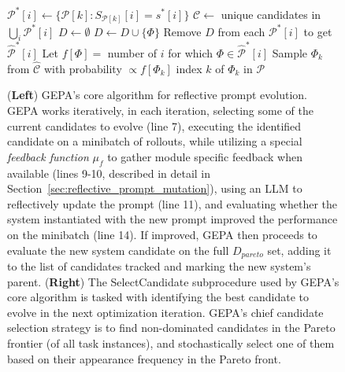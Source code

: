 \begin{figure}[t]
\begin{minipage}[t]{0.44\textwidth}
\begin{algorithm}[H]
\begin{algorithmic}[1]
            \State $\mathcal{P}^*[i] \gets \{\mathcal{P}[k] : S_{\mathcal{P}[k]}[i] = s^*[i]\}$
        \EndFor
        \State $\mathcal{C} \gets$ unique candidates in $\bigcup_i \mathcal{P}^*[i]$
        \State $D \gets \emptyset$
            \State $D \gets D \cup \{\Phi\}$
        \EndWhile
        \State Remove $D$ from each $\mathcal{P}^*[i]$ to get $\hat{\mathcal{P}}^*[i]$
        \State Let $f[\Phi]=$ number of $i$ for which $\Phi \in \hat{\mathcal{P}}^*[i]$
        \State Sample $\Phi_k$ from $\hat{\mathcal{C}}$ with probability $\propto f[\Phi_k]$
        \State \Return index $k$ of $\Phi_k$ in $\mathcal{P}$
    \EndFunction
    \end{algorithmic}\label{alg:pareto_selection}
    \end{algorithm}
\end{minipage}
\caption{(\textbf{Left}) GEPA's core algorithm for reflective prompt evolution. GEPA works iteratively, in each iteration, selecting some of the current candidates to evolve (line 7), executing the identified candidate on a minibatch of rollouts, while utilizing a special \textit{feedback function} $\mu_f$ to gather module specific feedback when available (lines 9-10, described in detail in Section~\ref{sec:reflective_prompt_mutation}), using an LLM to reflectively update the prompt (line 11), and evaluating whether the system instantiated with the new prompt improved the performance on the minibatch (line 14). If improved, GEPA then proceeds to evaluate the new system candidate on the full $D_{pareto}$ set, adding it to the list of candidates tracked and marking the new system's parent.
(\textbf{Right}) The SelectCandidate subprocedure used by GEPA's core algorithm is tasked with identifying the best candidate to evolve in the next optimization iteration. GEPA's chief candidate selection strategy is to find non-dominated candidates in the Pareto frontier (of all task instances), and stochastically select one of them based on their appearance frequency in the Pareto front.}\label{fig:gepa_pseudocode}
\vspace{-3mm}
\end{figure}